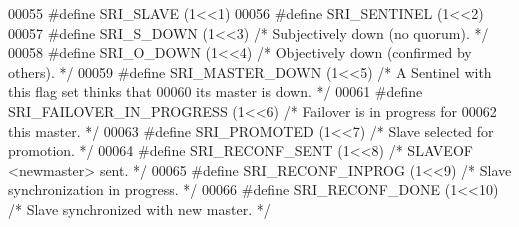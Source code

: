 \begin{DoxyCode}
00055 \textcolor{preprocessor}{#}\textcolor{preprocessor}{define} \textcolor{preprocessor}{SRI\_SLAVE}   \textcolor{preprocessor}{(}1\textcolor{preprocessor}{<<}1\textcolor{preprocessor}{)}
00056 \textcolor{preprocessor}{#}\textcolor{preprocessor}{define} \textcolor{preprocessor}{SRI\_SENTINEL} \textcolor{preprocessor}{(}1\textcolor{preprocessor}{<<}2\textcolor{preprocessor}{)}
00057 \textcolor{preprocessor}{#}\textcolor{preprocessor}{define} \textcolor{preprocessor}{SRI\_S\_DOWN} \textcolor{preprocessor}{(}1\textcolor{preprocessor}{<<}3\textcolor{preprocessor}{)}   \textcolor{comment}{/* Subjectively down (no quorum). */}
00058 \textcolor{preprocessor}{#}\textcolor{preprocessor}{define} \textcolor{preprocessor}{SRI\_O\_DOWN} \textcolor{preprocessor}{(}1\textcolor{preprocessor}{<<}4\textcolor{preprocessor}{)}   \textcolor{comment}{/* Objectively down (confirmed by others). */}
00059 \textcolor{preprocessor}{#}\textcolor{preprocessor}{define} \textcolor{preprocessor}{SRI\_MASTER\_DOWN} \textcolor{preprocessor}{(}1\textcolor{preprocessor}{<<}5\textcolor{preprocessor}{)} \textcolor{comment}{/* A Sentinel with this flag set thinks that}
00060 \textcolor{comment}{                                   its master is down. */}
00061 \textcolor{preprocessor}{#}\textcolor{preprocessor}{define} \textcolor{preprocessor}{SRI\_FAILOVER\_IN\_PROGRESS} \textcolor{preprocessor}{(}1\textcolor{preprocessor}{<<}6\textcolor{preprocessor}{)} \textcolor{comment}{/* Failover is in progress for}
00062 \textcolor{comment}{                                           this master. */}
00063 \textcolor{preprocessor}{#}\textcolor{preprocessor}{define} \textcolor{preprocessor}{SRI\_PROMOTED} \textcolor{preprocessor}{(}1\textcolor{preprocessor}{<<}7\textcolor{preprocessor}{)}            \textcolor{comment}{/* Slave selected for promotion. */}
00064 \textcolor{preprocessor}{#}\textcolor{preprocessor}{define} \textcolor{preprocessor}{SRI\_RECONF\_SENT} \textcolor{preprocessor}{(}1\textcolor{preprocessor}{<<}8\textcolor{preprocessor}{)}     \textcolor{comment}{/* SLAVEOF <newmaster> sent. */}
00065 \textcolor{preprocessor}{#}\textcolor{preprocessor}{define} \textcolor{preprocessor}{SRI\_RECONF\_INPROG} \textcolor{preprocessor}{(}1\textcolor{preprocessor}{<<}9\textcolor{preprocessor}{)}   \textcolor{comment}{/* Slave synchronization in progress. */}
00066 \textcolor{preprocessor}{#}\textcolor{preprocessor}{define} \textcolor{preprocessor}{SRI\_RECONF\_DONE} \textcolor{preprocessor}{(}1\textcolor{preprocessor}{<<}10\textcolor{preprocessor}{)}     \textcolor{comment}{/* Slave synchronized with new master. */}

\end{DoxyCode}
